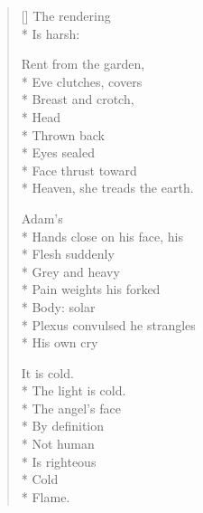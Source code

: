 \label{ch:masaccio}
\settowidth{\versewidth}{Plexus convulsed he strangles}
\begin{verse}[\versewidth]
The rendering \\*
Is harsh:

Rent from the garden,\\*
Eve clutches, covers\\*
Breast and crotch,\\*
Head\\*
Thrown back\\*
Eyes sealed\\*
Face thrust toward\\*
Heaven, she treads the earth.

Adam's \\*
Hands close on his face, his\\*
Flesh suddenly\\*
Grey and heavy\\*
Pain weights his forked \\*
Body: solar\\*
Plexus convulsed he strangles\\*
His own cry

It is cold.\\*
The light is cold.\\*
The angel's face\\*
By definition\\*
Not human\\*
Is righteous\\*
Cold\\*
Flame.
\end{verse}
